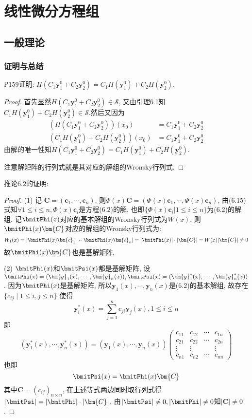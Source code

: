 \chapter{线性微分方程组}


\section{一般理论}


\subsection{证明与总结}


P159证明: $H(C_1\bm{y}_1^0+C_2\bm{y}_2^0)=C_1H(\bm{y}_1^0)+C_2H(\bm{y}_2^0)$.
\begin{proof} 首先显然$H(C_1\bm{y}_1^0+C_2\bm{y}_2^0)\in\mathcal{S}$, 
又由引理6.1知$C_1H(\bm{y}_1^0)+C_2H(\bm{y}_2^0)\in\mathcal{S}$.然后又因为
\[\begin{split}\left(H(C_1\bm{y}_1^0+C_2\bm{y}_2^0)\right)(x_0)&=C_1\bm{y}_1^0+C_2\bm{y}_2^0\\
\left(C_1H(\bm{y}_1^0)+C_2H(\bm{y}_2^0)\right)(x_0)&=C_1\bm{y}_1^0+C_2\bm{y}_2^0
\end{split}\]
由解的唯一性知$H(C_1\bm{y}_1^0+C_2\bm{y}_2^0)=C_1H(\bm{y}_1^0)+C_2H(\bm{y}_2^0)$.

注意解矩阵的行列式就是其对应的解组的Wronsky行列式.
\end{proof}

推论6.2的证明:

\begin{proof}
(1) 记 $\bm{C}=(\bm{c}_1,\cdots,\bm{c}_n)$, 则$\bm{\varPhi}(x)\bm{C}=(\bm{\varPhi}(x)\bm{c}_1,\cdots,\bm{\varPhi}(x)\bm{c}_n)$, 由(6.15)式知$\forall1\leq i\leq n,\bm{\varPhi}(x)\bm{c}_i$是方程(6.2)的解, 也即$\{\bm{\varPhi}(x)\bm{c}_i|1\leq i\leq n\}$为(6.2)的解组. 记$\bmitPhi(x)$对应的基本解组的Wronsky行列式为$W(x)$, 则$\bmitPhi(x)\bm{C}$对应的解组的Wronsky行列式为:
\[W_1(x)=|\bmitPhi(x)\bm{c}_1\cdots\bmitPhi(x)\bm{c}_n|=|\bmitPhi(x)|\cdot|\bm{C}|=W(x)|\bm{C}|\neq0\]
故$\bmitPhi(x)\bm{C}$也是基解矩阵.

(2) $\bmitPhi(x)$和$\bmitPsi(x)$都是基解矩阵, 
设$\bmitPhi(x)=(\bm{y}_1(x),\cdots,\bm{y}_n(x)),\bmitPsi(x)=(\bm{y}_1^*(x),\cdots,\bm{y}_n^*(x))$. 
因为$\bmitPhi(x)$是基解矩阵, 所以$\bm{y}_1(x),\cdots,\bm{y}_n(x)$是(6.2)的基本解组, 
故存在 $\{c_{ij}\mid 1\leq i,j\leq n\}$ 使得
\[\bm{y}_i^*(x)=\sum_{j=1}^nc_{ji}\bm{y}_j(x),1\leq i\leq n\]
即
\[(\bm{y}_1^*(x),\cdots,\bm{y}_n^*(x))=(\bm{y}_1(x),\cdots,\bm{y}_n(x))
\begin{pmatrix}
c_{11}&c_{12}&\cdots&c_{1n}\\
c_{21}&c_{22}&\cdots&c_{2n}\\
\vdots&\vdots&&\vdots\\
c_{n1}&c_{n2}&\cdots&c_{nn}
\end{pmatrix}\]
也即\[\bmitPsi(x)=\bmitPhi(x)\bm{C}\]
其中$\bm{C}=(c_{ij})_{n\times n}$, 在上述等式两边同时取行列式得$|\bmitPsi|=|\bmitPhi|\cdot|\bm{C}|$, 
由$|\bmitPsi|\neq0,|\bmitPhi|\neq0$知$|\bm{C}|\neq0$.
\end{proof}


